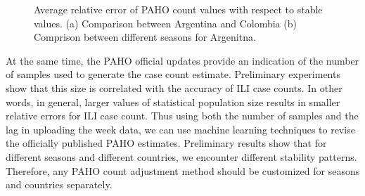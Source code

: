 \begin{figure}[h]
\centering
{}
\hspace{1em}
  \scriptsize
\caption{
  \label{fig:relerrors:all}
  Average relative error of PAHO count values with respect to stable values.
  (a) Comparison between Argentina and Colombia (b) Comprison between different 
  seasons for Argenitna.}
\end{figure}



At the same time, the PAHO official updates provide an indication of the number of samples
used to generate the case count estimate. Preliminary experiments show that
this size is correlated with the accuracy of ILI case counts. In other words,
in general, larger values of statistical population size results in smaller
relative errors for ILI case count. Thus using both the number of samples and the lag in 
uploading the week data, we can use machine learning techniques to revise the officially 
published PAHO estimates. Preliminary results
show that for different seasons and different countries, we encounter different
stability patterns. Therefore, any PAHO count adjustment method should be
customized for seasons and countries separately. 

